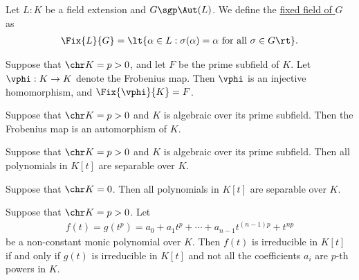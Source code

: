 \documentclass[a4paper]{article}
\begin{document}
\begin{tdefinition}
  Let \( L:K \) be a field extension and \( G \sgp \Aut(L) \).
  We define the \ul{fixed field of \( G \)} as \begin{align*}
    \Fix{L}{G} = \lt\{ \alpha\in L : \sigma(\alpha) = \alpha \text{ for all } \sigma\in G \rt\}.
  \end{align*}
\end{tdefinition}

\begin{ttheorem}
  Suppose that \( \chr K = p>0 \), and let \( F \) be the prime subfield of \( K \).
  Let \( \vphi:K\to K \) denote the Frobenius map.
  Then \( \vphi \) is an injective homomorphism, and \( \Fix{\vphi}{K} = F \).
\end{ttheorem}

\begin{tcorollary}
  Suppose that \( \chr K = p > 0 \) and \( K \) is algebraic over its prime subfield.
  Then the Frobenius map is an automorphism of \( K \).
\end{tcorollary}

\begin{tcorollary}
  Suppose that \( \chr K = p > 0 \) and \( K \) is algebraic over its prime subfield.
  Then all polynomials in \( K[t] \) are separable over \( K \).
\end{tcorollary}

\begin{tcorollary}[**]
  Suppose that \( \chr K = 0 \).
  Then all polynomials in \( K[t] \) are separable over \( K \).
\end{tcorollary}

\begin{ttheorem}
  Suppose that \( \chr K = p > 0 \). Let \begin{align*}
    f(t) = g(t^p) = a_0+a_1t^p+\cdots+a_{n-1}t^{(n-1)p}+t^{np}
  \end{align*}
  be a non-constant monic polynomial over \( K \).
  Then \( f(t) \) is irreducible in \( K[t] \) if and only if \( g(t) \) is irreducible in \( K[t] \) and not all the coefficients \( a_i \) are \( p \)-th powers in \( K \).
\end{ttheorem}
\end{document}
